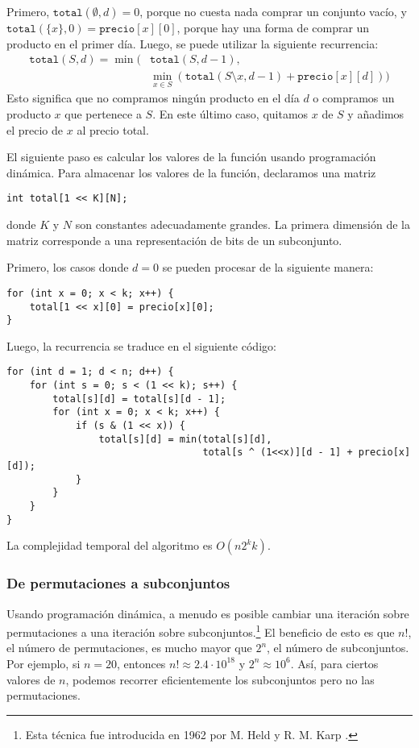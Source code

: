 Primero, $\texttt{total}(\emptyset,d) = 0$,
porque no cuesta nada comprar un conjunto vacío,
y $\texttt{total}(\{x\},0) = \texttt{precio}[x][0]$,
porque hay una forma de comprar un producto en el primer día.
Luego, se puede utilizar la siguiente recurrencia:
\begin{equation*}
    \begin{split}
        \texttt{total}(S,d) = \min( & \texttt{total}(S,d-1), \\
        & \min_{x \in S} (\texttt{total}(S \setminus x,d-1)+\texttt{precio}[x][d]))
    \end{split}
\end{equation*}
Esto significa que no compramos ningún producto en el día $d$
o compramos un producto $x$ que pertenece a $S$.
En este último caso, quitamos $x$ de $S$ y añadimos el
precio de $x$ al precio total.

El siguiente paso es calcular los valores de la función
usando programación dinámica.
Para almacenar los valores de la función, declaramos una matriz
\begin{lstlisting}
int total[1 << K][N];
\end{lstlisting}
donde $K$ y $N$ son constantes adecuadamente grandes.
La primera dimensión de la matriz corresponde a una representación de bits de un subconjunto.

Primero, los casos donde $d=0$ se pueden procesar de la siguiente manera:
\begin{lstlisting}
for (int x = 0; x < k; x++) {
    total[1 << x][0] = precio[x][0];
}
\end{lstlisting}
Luego, la recurrencia se traduce en el siguiente código:
\begin{lstlisting}
for (int d = 1; d < n; d++) {
    for (int s = 0; s < (1 << k); s++) {
        total[s][d] = total[s][d - 1];
        for (int x = 0; x < k; x++) {
            if (s & (1 << x)) {
                total[s][d] = min(total[s][d],
                                  total[s ^ (1<<x)][d - 1] + precio[x][d]);
            }
        }
    }
}
\end{lstlisting}
La complejidad temporal del algoritmo es $O(n 2^k k)$.

\subsubsection{De permutaciones a subconjuntos}

Usando programación dinámica, a menudo es posible
cambiar una iteración sobre permutaciones a
una iteración sobre subconjuntos.\footnote{Esta técnica fue introducida en 1962
    por M. Held y R. M. Karp \cite{hel62}.}
El beneficio de esto es que
$n!$, el número de permutaciones,
es mucho mayor que $2^n$, el número de subconjuntos.
Por ejemplo, si $n=20$, entonces
$n! \approx 2.4 \cdot 10^{18}$ y $2^n \approx 10^6$.
Así, para ciertos valores de $n$,
podemos recorrer eficientemente los subconjuntos pero no las permutaciones.

